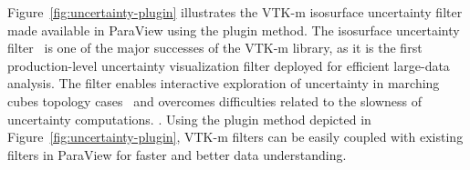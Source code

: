 Figure~\ref{fig:uncertainty-plugin} illustrates the VTK-m isosurface uncertainty filter made available in ParaView using the plugin method. The isosurface uncertainty filter~\cite{Wang2023} is one of the major successes of the VTK-m library, as it is the first production-level uncertainty visualization filter deployed for efficient large-data analysis. The filter enables interactive exploration of uncertainty in marching cubes topology cases~\cite{Athawale21} and overcomes difficulties related to the slowness of uncertainty computations. . Using the plugin method depicted in Figure~\ref{fig:uncertainty-plugin}, VTK-m filters can be easily coupled with existing filters in ParaView for faster and better data understanding.

